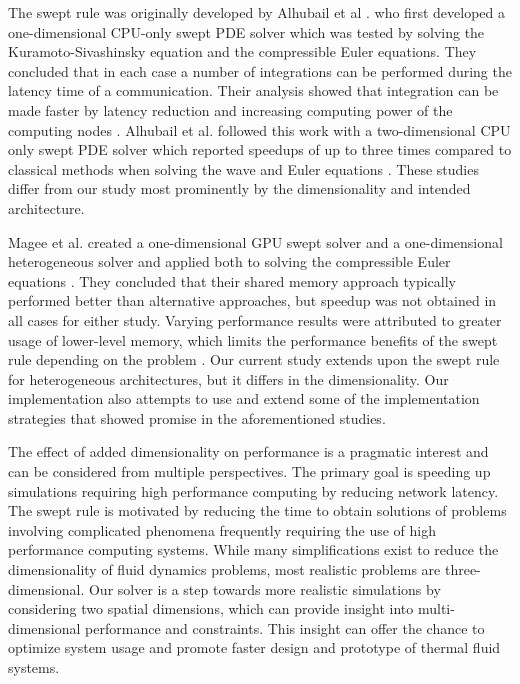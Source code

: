 \documentclass[preprints,article,accept,moreauthors,pdftex]{Definitions/mdpi}
\begin{document}
\par
The swept rule was originally developed by Alhubail et al \cite{Alhubail2016ThePDEs}. who first developed a one-dimensional CPU-only swept PDE solver which was tested by solving the Kuramoto-Sivashinsky equation and the compressible Euler equations. They concluded that in each case a number of integrations can be performed during the latency time of a communication. Their analysis showed that integration can be made faster by latency reduction and increasing computing power of the computing nodes \cite{Alhubail2016ThePDEs}. Alhubail et al. followed this work with a two-dimensional CPU only swept PDE solver which reported speedups of up to three times compared to classical methods when solving the wave and Euler equations \cite{Alhubail2018ThePDEs}. These studies differ from our study most prominently by the dimensionality and intended architecture.

\par
Magee et al. created a one-dimensional GPU swept solver and a one-dimensional heterogeneous solver and applied both to solving the compressible Euler equations \cite{Magee2018AcceleratingDecomposition,Magee2020ApplyingSystems}. They concluded that their shared memory approach typically performed better than alternative approaches, but speedup was not obtained in all cases for either study. Varying performance results were attributed to greater usage of lower-level memory, which limits the performance benefits of the swept rule depending on the problem \cite{Magee2018AcceleratingDecomposition}. Our current study extends upon the swept rule for heterogeneous architectures, but it differs in the dimensionality. Our implementation also attempts to use and extend some of the implementation strategies that showed promise in the aforementioned studies.

\par
The effect of added dimensionality on performance is a pragmatic interest and can be considered from multiple perspectives. The primary goal is speeding up simulations requiring high performance computing by reducing network latency. The swept rule is motivated by reducing the time to obtain solutions of problems involving complicated phenomena frequently requiring the use of high performance computing systems. While many simplifications exist to reduce the dimensionality of fluid dynamics problems, most realistic problems are three-dimensional. Our solver is a step towards more realistic simulations by considering two spatial dimensions, which can provide insight into multi-dimensional performance and constraints. This insight can offer the chance to optimize system usage and promote faster design and prototype of thermal fluid systems.
\end{document}
